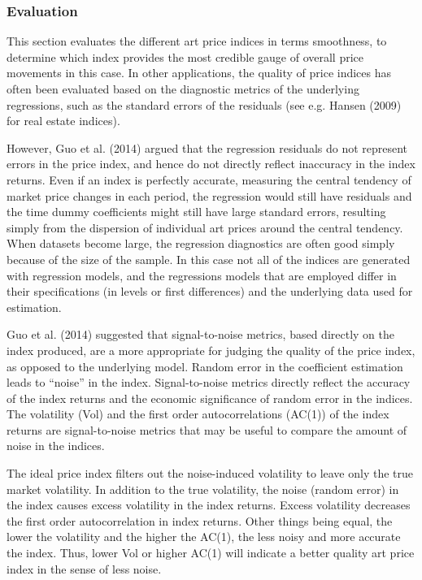 \documentclass[]{elsarticle} %
\begin{document}
\subsubsection{Evaluation}\label{evaluation}

This section evaluates the different art price indices in terms
smoothness, to determine which index provides the most credible gauge of
overall price movements in this case. In other applications, the quality
of price indices has often been evaluated based on the diagnostic
metrics of the underlying regressions, such as the standard errors of
the residuals (see e.g. Hansen (2009) for real estate indices).

However, Guo et al. (2014) argued that the regression residuals do not
represent errors in the price index, and hence do not directly reflect
inaccuracy in the index returns. Even if an index is perfectly accurate,
measuring the central tendency of market price changes in each period,
the regression would still have residuals and the time dummy
coefficients might still have large standard errors, resulting simply
from the dispersion of individual art prices around the central
tendency. When datasets become large, the regression diagnostics are
often good simply because of the size of the sample. In this case not
all of the indices are generated with regression models, and the
regressions models that are employed differ in their specifications (in
levels or first differences) and the underlying data used for
estimation.

Guo et al. (2014) suggested that signal-to-noise metrics, based directly
on the index produced, are a more appropriate for judging the quality of
the price index, as opposed to the underlying model. Random error in the
coefficient estimation leads to ``noise'' in the index. Signal-to-noise
metrics directly reflect the accuracy of the index returns and the
economic significance of random error in the indices. The volatility
(Vol) and the first order autocorrelations (AC(1)) of the index returns
are signal-to-noise metrics that may be useful to compare the amount of
noise in the indices.

The ideal price index filters out the noise-induced volatility to leave
only the true market volatility. In addition to the true volatility, the
noise (random error) in the index causes excess volatility in the index
returns. Excess volatility decreases the first order autocorrelation in
index returns. Other things being equal, the lower the volatility and
the higher the AC(1), the less noisy and more accurate the index. Thus,
lower Vol or higher AC(1) will indicate a better quality art price index
in the sense of less noise.
\end{document}

